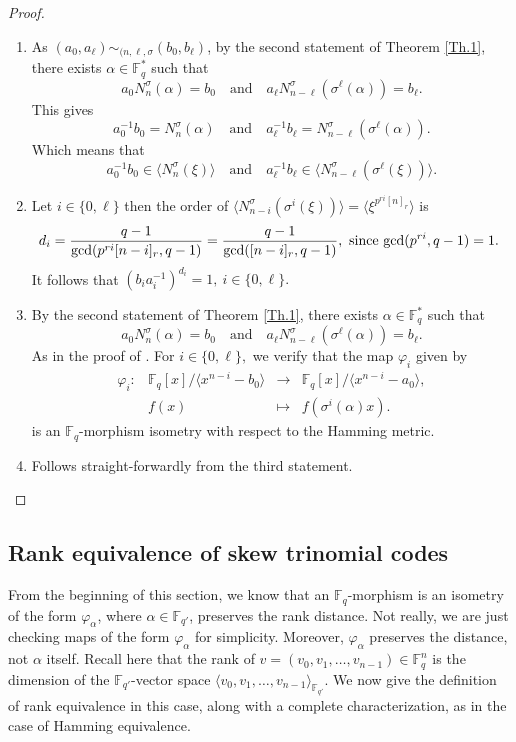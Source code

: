 \documentclass[12pt,paper]{article}
\theoremstyle{plain}
\newcommand{\Fq}{\mathbb{F}_{q}}
\begin{document}
\begin{proof}
\begin{enumerate}
\item  As $ (a_0, a_{\ell}) \sim_{(n, \ell,\sigma} (b_0, b_{\ell})$, by the second  statement of Theorem \ref{Th.1}, 
there exists $\alpha\in \Fq^*$ such that $$ a_0 N_n^{\sigma}(\alpha)  = b_0   \quad  \text{and} \quad   a_{\ell} N^{\sigma}_{n-\ell}(\sigma^{\ell}(\alpha))=  b_{\ell}. $$
This gives
$$ a_0^{-1}  b_0 = N_n^{\sigma}(\alpha)  \quad  \text{and} \quad   a_{\ell}^{-1}   b_{\ell}=  N^{\sigma}_{n-\ell}(\sigma^{\ell}(\alpha)) . $$
Which means that  
$$ a_0^{-1}  b_0 \in   \langle  N_n^{\sigma}(\xi) \rangle  \quad  \text{and} \quad   a_{\ell}^{-1}   b_{\ell} \in  
\langle   N^{\sigma}_{n-\ell}(\sigma^{\ell}(\xi))  \rangle. $$

\item Let   $i\in \{0,\ell\}$ then the order of $ \langle   N^{\sigma}_{n-i}(\sigma^{i}(\xi))  \rangle =
\langle   \xi^{p^{ri}[n]_r}  \rangle $ is  $$d_i=\dfrac{q-1}{\gcd(p^{ri}[n-i]_r, q-1)}= \dfrac{q-1}{\gcd([n-i]_r, q-1)} , \text{ since $ \gcd(p^{ri},q-1)=1.$ }$$  It follows that  $(b_i a_i^{-1})^{d_i} =1 ,\ i\in \{0,\ell\}.$
\item By the second  statement of Theorem \ref{Th.1}, 
there exists $\alpha\in \Fq^*$ such that $$ a_0 N_n^{\sigma}(\alpha)  = b_0   \quad  \text{and} \quad   a_{\ell} N^{\sigma}_{n-\ell}(\sigma^{\ell}(\alpha))=  b_{\ell}. $$  As in the proof of \cite[Theorem 6]{Ouazzou2025}. For $i\in \{0,\ell\},$ we verify
 that the  map  $\varphi_i$ given by 
\begin{equation}
  	\begin{array}{cccc}
  	\varphi_{i}:& \mathbb{F}_q[x] /\langle x^{n-i}-b_0 \rangle  &\longrightarrow & \mathbb{F}_q[x] /\langle x^{n-i}-a_0 \rangle, \\
  	& f(x) & \longmapsto &  f(\sigma^i(\alpha) x). 
  	\end{array}
  	\end{equation} 
    is an $\Fq$-morphism isometry with respect to the Hamming  metric.
    \item Follows straight-forwardly from the third statement.
\end{enumerate}
\end{proof}

\subsection{Rank equivalence  of  skew  trinomial codes}
From the beginning of this section, we know that an $\mathbb{F}_{q}$-morphism is an isometry of the form $\varphi_{\alpha}$, where $\alpha \in \mathbb{F}_{q'}$, preserves the rank distance. Not really, we are just checking maps of the form $\varphi_\alpha$ for simplicity. Moreover, $\varphi_\alpha$ preserves the distance, not $\alpha$ itself. Recall here that the rank of $v=(v_0,v_1,\ldots,v_{n-1})\in \Fq^n$ is the dimension of the $\mathbb{F}_{q'}$-vector space $ \langle v_0,v_1,\ldots,v_{n-1}\rangle_{\mathbb{F}_{q'}}.$ We  now give the definition of rank equivalence in this case, along with a complete characterization, as in the case of Hamming equivalence.
\end{document}
